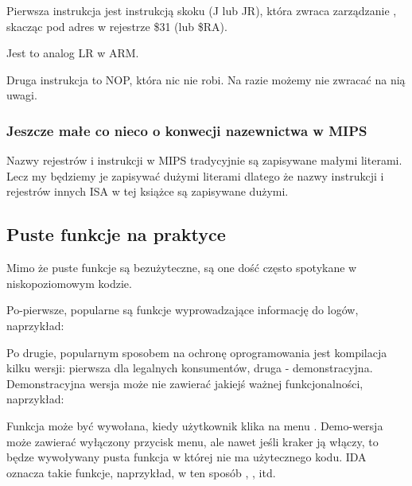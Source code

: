 
Pierwsza instrukcja jest instrukcją skoku (J lub JR),
która zwraca zarządzanie , skacząc pod adres w rejestrze \$31 (lub \$RA).

Jest to analog \ac{LR} w ARM.

Druga instrukcja to \ac{NOP}, która nic nie robi.
Na razie możemy nie zwracać na nią uwagi.

\subsubsection{Jeszcze małe co nieco o konwecji nazewnictwa w MIPS}
Nazwy rejestrów i instrukcji w MIPS tradycyjnie są zapisywane małymi literami.
Lecz my będziemy je zapisywać dużymi literami dlatego że nazwy instrukcji i rejestrów innych 
\ac{ISA} w tej książce są zapisywane dużymi.

\subsection{Puste funkcje na praktyce}

Mimo że puste funkcje są bezużyteczne, są one dość często spotykane w niskopoziomowym kodzie.

Po-pierwsze, popularne są funkcje wyprowadzające informację do logów, naprzykład:



Po drugie, popularnym sposobem na ochronę oprogramowania jest kompilacja kilku wersji: pierwsza dla legalnych konsumentów, druga - demonstracyjna. Demonstracyjna wersja może nie zawierać jakiejś ważnej funkcjonalności, naprzykład:


Funkcja  może być wywołana, kiedy użytkownik klika na menu .
Demo-wersja może zawierać wyłączony przycisk menu, ale nawet jeśli kraker ją włączy, to będze wywoływany pusta funkcja w której nie ma użytecznego kodu.
IDA oznacza takie funkcje, naprzykład, w ten sposób , , itd.


